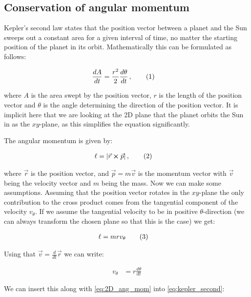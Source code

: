 \documentclass[reprint,english,notitlepage]{revtex4-1}  %
\newcommand\numberthis{\addtocounter{equation}{1}\tag{\theequation}}
\begin{document}
\subsection{Conservation of angular momentum} \label{sec:II:d}

Kepler's second law states that the position vector between a planet and the Sun sweeps out a constant area for a given interval of time, no matter the starting position of the planet in its orbit. Mathematically this can be formulated as follows:

\begin{align*}
\frac{dA}{dt} &= \frac{r^2}{2} \frac{d\theta}{dt} \, , \numberthis \label{eq:kepler_second}
\end{align*}

where $A$ is the area swept by the position vector, $r$ is the length of the position vector and $\theta$ is the angle determining the direction of the position vector. It is implicit here that we are looking at the 2D plane that the planet orbits the Sun in as the $xy$-plane, as this simplifies the equation significantly.

The angular momentum is given by:

\begin{align*}
\ell &= |\vec{r} \cross \vec{p}| \, ,\numberthis \label{eq:ang_mom}
\end{align*}

where $\vec{r}$ is the position vector, and $\vec{p} = m \vec{v}$ is the momentum vector with $\vec{v}$ being the velocity vector and $m$ being the mass. Now we can make some assumptions. Assuming that the position vector rotates in the $xy$-plane the only contribution to the cross product comes from the tangential component of the velocity $v_\theta$. If we assume the tangential velocity to be in positive $\theta$-direction (we can always transform the chosen plane so that this is the case) we get:

\begin{align*}
\ell &= mrv_\theta \numberthis \label{eq:2D_ang_mom}
\end{align*}

Using that $\vec{v} = \frac{d}{dt} \vec{r}$ we can write:

\begin{align*}
v_\theta &= r \frac{d\theta}{dt}
\end{align*}

We can insert this along with \eqref{eq:2D_ang_mom} into \eqref{eq:kepler_second}:
\end{document}
